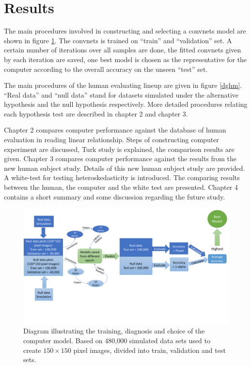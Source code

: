 \documentclass[12pt]{article}
\begin{document}
\section{Results}
\label{sec:results}

The main procedures involved in constructing and selecting a convnets
model are shown in figure \ref{dgpc}. The convnets is trained on
``train'' and ``validation'' set. A certain number of iterations over
all samples are done, the fitted convnets given by each iteration are
saved, one best model is chosen as the representative for the computer
according to the overall accuracy on the unseen ``test'' set.

The main procedures of the human evaluating lineup are given in figure
\ref{dghm}. ``Real data'' and ``null data'' stand for datasets simulated
under the alternative hypothesis and the null hypothesis respectively.
More detailed procedures relating each hypothesis test are described in
chapter 2 and chapter 3.

Chapter 2 compares computer performance against the database of human
evaluation in reading linear relationship. Steps of constructing
computer experiment are discussed, Turk study is explained, the
comparison results are given. Chapter 3 compares computer performance
against the results from the new human subject study. Details of this
new human subject study are provided. A white-test \citep{white} for
testing heteroskedasticity is introduced. The comparing results between
the human, the computer and the white test are presented. Chapter 4
contains a short summary and some discussion regarding the future study.

\begin{figure}[h]
\centerline{\includegraphics[width=15cm]{figures/diagpc.png}}
\caption{Diagram illustrating the training, diagnosis and choice of the computer model. Based on 480,000 simulated data sets used to create $150\times 150$ pixel images, divided into train, validation and test sets.}
\label{dgpc}
\end{figure}
\end{document}
